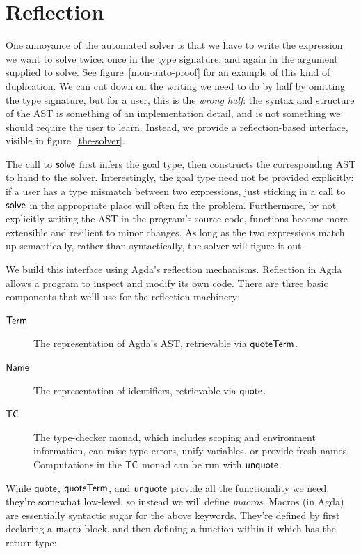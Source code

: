 \documentclass[draft, twocolumn]{article}
\theoremstyle{definition}
\theoremstyle{definition}
\begin{document}
\section{Reflection} \label{reflection}
One annoyance of the automated solver is that we have to write the expression we
want to solve twice: once in the type signature, and again in the argument
supplied to solve. See figure~\ref{mon-auto-proof} for an example of this kind
of duplication. We can cut down on the writing we need to do by half by omitting
the type signature, but for a user, this is the \emph{wrong half}: the syntax
and structure of the AST is something of an implementation detail, and is not
something we should require the user to learn. Instead, we provide a
reflection-based interface, visible in figure~\ref{the-solver}.

The call to \(\AgdaMacro{solve}\) first infers the goal type, then constructs
the corresponding AST to hand to the solver. Interestingly, the goal type need
not be provided explicitly: if a user has a type mismatch between two
expressions, just sticking in a call to \(\AgdaMacro{solve}\) in the appropriate
place will often fix the problem. Furthermore, by not explicitly writing the AST
in the program's source code, functions become more extensible and resilient to
minor changes. As long as the two expressions match up semantically, rather than
syntactically, the solver will figure it out.

We build this interface using Agda's reflection
mechanisms\cite{van_der_walt_reflection_2012}. Reflection in Agda allows a
program to inspect and modify its own code. There are three basic components
that we'll use for the reflection machinery:
\begin{description}
  \item[\(\AgdaDatatype{Term}\)] The representation of Agda's AST, retrievable
    via \(\AgdaKeyword{quoteTerm}\).
  \item[\(\AgdaDatatype{Name}\)] The representation of identifiers, retrievable
    via \(\AgdaKeyword{quote}\).
  \item[\(\AgdaDatatype{TC}\)] The type-checker monad, which includes scoping
    and environment information, can raise type errors, unify variables, or
    provide fresh names. Computations in the \(\AgdaDatatype{TC}\) monad can be
    run with \(\AgdaKeyword{unquote}\).
\end{description}

While \(\AgdaKeyword{quote}\), \(\AgdaKeyword{quoteTerm}\), and
\(\AgdaKeyword{unquote}\) provide all the functionality we need, they're
somewhat low-level, so instead we will define \emph{macros}. Macros (in Agda)
are essentially syntactic sugar for the above keywords. They're defined by first
declaring a \(\AgdaKeyword{macro}\) block, and then defining a function within
it which has the return type:
\end{document}

